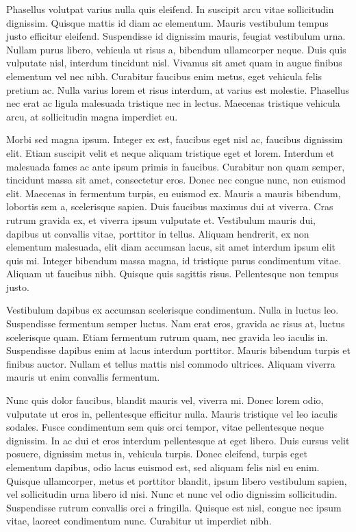 Phasellus volutpat varius nulla quis eleifend. In suscipit arcu vitae sollicitudin dignissim. Quisque mattis id diam ac elementum. Mauris vestibulum tempus justo efficitur eleifend. Suspendisse id dignissim mauris, feugiat vestibulum urna. Nullam purus libero, vehicula ut risus a, bibendum ullamcorper neque. Duis quis vulputate nisl, interdum tincidunt nisl. Vivamus sit amet quam in augue finibus elementum vel nec nibh. Curabitur faucibus enim metus, eget vehicula felis pretium ac. Nulla varius lorem et risus interdum, at varius est molestie. Phasellus nec erat ac ligula malesuada tristique nec in lectus. Maecenas tristique vehicula arcu, at sollicitudin magna imperdiet eu.

Morbi sed magna ipsum. Integer ex est, faucibus eget nisl ac, faucibus dignissim elit. Etiam suscipit velit et neque aliquam tristique eget et lorem. Interdum et malesuada fames ac ante ipsum primis in faucibus. Curabitur non quam semper, tincidunt massa sit amet, consectetur eros. Donec nec congue nunc, non euismod elit. Maecenas in fermentum turpis, eu euismod ex. Mauris a mauris bibendum, lobortis sem a, scelerisque sapien. Duis faucibus maximus dui at viverra. Cras rutrum gravida ex, et viverra ipsum vulputate et. Vestibulum mauris dui, dapibus ut convallis vitae, porttitor in tellus. Aliquam hendrerit, ex non elementum malesuada, elit diam accumsan lacus, sit amet interdum ipsum elit quis mi. Integer bibendum massa magna, id tristique purus condimentum vitae. Aliquam ut faucibus nibh. Quisque quis sagittis risus. Pellentesque non tempus justo.

Vestibulum dapibus ex accumsan scelerisque condimentum. Nulla in luctus leo. Suspendisse fermentum semper luctus. Nam erat eros, gravida ac risus at, luctus scelerisque quam. Etiam fermentum rutrum quam, nec gravida leo iaculis in. Suspendisse dapibus enim at lacus interdum porttitor. Mauris bibendum turpis et finibus auctor. Nullam et tellus mattis nisl commodo ultrices. Aliquam viverra mauris ut enim convallis fermentum.

Nunc quis dolor faucibus, blandit mauris vel, viverra mi. Donec lorem odio, vulputate ut eros in, pellentesque efficitur nulla. Mauris tristique vel leo iaculis sodales. Fusce condimentum sem quis orci tempor, vitae pellentesque neque dignissim. In ac dui et eros interdum pellentesque at eget libero. Duis cursus velit posuere, dignissim metus in, vehicula turpis. Donec eleifend, turpis eget elementum dapibus, odio lacus euismod est, sed aliquam felis nisl eu enim. Quisque ullamcorper, metus et porttitor blandit, ipsum libero vestibulum sapien, vel sollicitudin urna libero id nisi. Nunc et nunc vel odio dignissim sollicitudin. Suspendisse rutrum convallis orci a fringilla. Quisque est nisl, congue nec ipsum vitae, laoreet condimentum nunc. Curabitur ut imperdiet nibh.